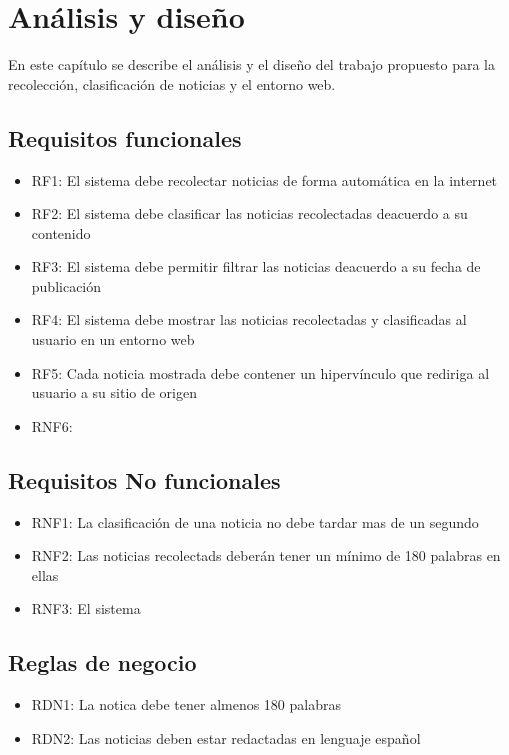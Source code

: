 \chapter{Análisis y diseño}\label{chp:introduccion}

En este capítulo se describe el análisis y el diseño del trabajo propuesto para
la recolección, clasificación de noticias y el entorno web.

\section{Requisitos funcionales}
\begin{itemize}
  \item RF1: El sistema debe recolectar noticias de forma automática en la internet
  \item RF2: El sistema debe clasificar las noticias recolectadas deacuerdo a su contenido
  \item RF3: El sistema debe permitir filtrar las noticias deacuerdo a su fecha de publicación
  \item RF4: El sistema debe mostrar las noticias recolectadas y clasificadas al usuario en un entorno web
  \item RF5: Cada noticia mostrada debe contener un hipervínculo que rediriga al usuario a su sitio de origen 
  \item RNF6:      

\end{itemize}

\section{Requisitos No funcionales}
\begin{itemize}
\section{Estructura del Documento}
  \item RNF1: La clasificación de una noticia no debe tardar mas de un segundo
  \item RNF2: Las noticias recolectads deberán tener un mínimo de 180 palabras en
  ellas
  \item RNF3: El sistema 

\end{itemize}



\section{Reglas de negocio}
\begin{itemize}
  \item RDN1: La notica debe tener almenos 180 palabras
  \item RDN2: Las noticias deben estar redactadas en lenguaje español
\end{itemize}

